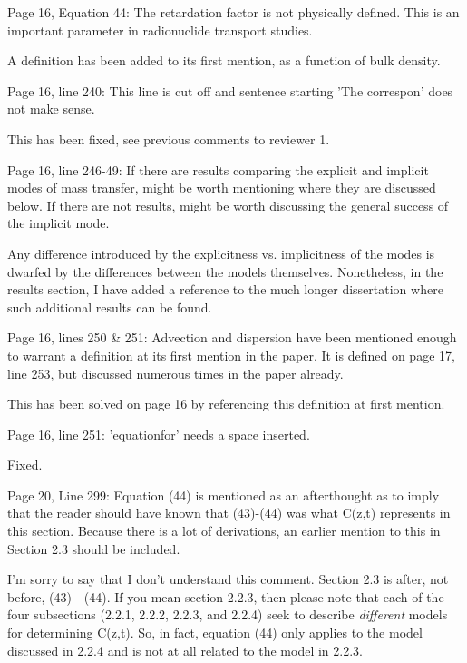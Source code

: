 \documentclass[answers,12pt]{exam}
\begin{document}
\begin{questions}
\begin{solution}
\end{solution} 
 
\question Page  16,  Equation  44:  The  retardation  factor  is  not 
physically defined. This is an important parameter in radionuclide transport 
studies.  \begin{solution}
A definition has been added to its first mention, as a function of bulk 
        density.
\end{solution} 
 
\question Page 16, line 240: This line is cut off and sentence starting 'The 
correspon' does not make sense.  \begin{solution}
This has been fixed, see previous comments to reviewer 1.
\end{solution} 
 
\question Page  16,  line  246-49:  If  there  are  results  comparing  the  
explicit  and  implicit  modes  of  mass  transfer,  might  be  worth  
mentioning  where  they  are  discussed  below.  If  there  are  not  results,  
might  be  worth discussing the general success of the implicit mode.  
\begin{solution}
Any difference introduced by the explicitness vs. implicitness of the modes is 
        dwarfed by the differences between the models themselves. Nonetheless, 
        in the results section, I have added a reference to the much longer 
        dissertation where such additional results can be found. 
\end{solution} 
 
\question Page  16,  lines  250 \& 251: Advection and dispersion have been 
mentioned enough to warrant a definition at  its  first  mention  in  the  
paper.  It  is  defined  on  page  17,  line  253,  but  discussed numerous 
times in the paper already.  
\begin{solution}
This has been solved on page 16 by referencing this definition at first 
        mention. 
\end{solution} 
 
\question Page 16, line 251: 'equationfor' needs a space inserted.  
\begin{solution}
Fixed.
\end{solution} 
 
\question Page  20,  Line  299:  Equation (44) is mentioned as an afterthought 
as to imply that the reader should have known  that  (43)-(44)  was  what  
C(z,t)  represents  in  this  section.  Because  there  is  a  lot  of  
derivations,  an earlier mention to this in Section 2.3 should be included.  
\begin{solution}
        I'm sorry to say that I don't understand this comment. Section 2.3 is 
        after, not before, (43) - (44). If you mean section 2.2.3, then please 
        note that each of the four subsections (2.2.1, 2.2.2, 2.2.3, and 2.2.4) 
        seek to describe \emph{different} models for determining C(z,t). So, in 
        fact, equation (44) only applies to the model discussed in 2.2.4 and is 
        not at all related to the model in 2.2.3.
\end{solution} 
 

\end{questions}
\end{document}

